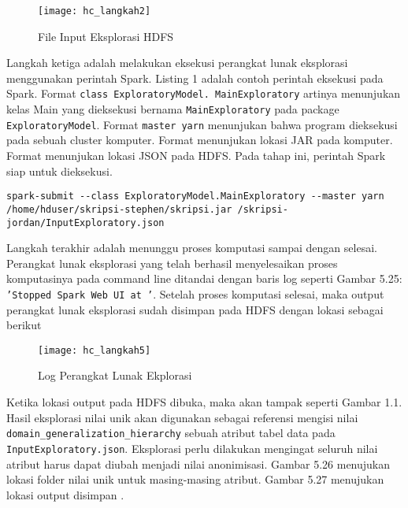 \begin{figure}[H]
	\centering
	\texttt{[image: hc\_langkah2]}
	\caption{File Input Eksplorasi HDFS}
	\label{fig:pertama2}
\end{figure}

Langkah ketiga adalah melakukan eksekusi perangkat lunak eksplorasi menggunakan perintah Spark. Listing 1 adalah contoh perintah eksekusi pada Spark. Format \texttt{\textemdash\textemdash class ExploratoryModel. MainExploratory} artinya menunjukan kelas Main yang dieksekusi bernama \texttt{MainExploratory} pada package \texttt{ExploratoryModel}. Format \texttt{\textemdash\textemdash master yarn} menunjukan bahwa program dieksekusi pada sebuah cluster komputer. Format  menunjukan lokasi JAR pada komputer. Format  menunjukan lokasi JSON pada HDFS. Pada tahap ini, perintah Spark siap untuk dieksekusi.

\begin{lstlisting}[basicstyle=\ttfamily, frame=single,
	columns=fullflexible, keepspaces=true, breaklines=true, label=lst:pl_csv, caption=Perintah Eksekusi Spark]
spark-submit --class ExploratoryModel.MainExploratory --master yarn /home/hduser/skripsi-stephen/skripsi.jar /skripsi-jordan/InputExploratory.json

\end{lstlisting}

\vspace{0.3cm}
Langkah terakhir adalah menunggu proses komputasi sampai dengan selesai.  Perangkat lunak eksplorasi yang telah berhasil menyelesaikan proses komputasinya  pada command line ditandai dengan baris log seperti Gambar 5.25: \texttt{'Stopped Spark Web UI at '}. Setelah proses komputasi selesai, maka output perangkat lunak eksplorasi sudah disimpan pada HDFS dengan lokasi sebagai berikut 

\begin{figure}[H]
	\centering
	\texttt{[image: hc\_langkah5]}
	\caption{Log Perangkat Lunak Ekplorasi}
	\label{fig:pertama2}
\end{figure}

Ketika lokasi output pada HDFS dibuka, maka akan tampak seperti Gambar 1.1. Hasil eksplorasi nilai unik akan digunakan sebagai referensi mengisi nilai \texttt{domain\_generalization\_hierarchy} sebuah atribut tabel data pada \texttt{InputExploratory.json}. Eksplorasi perlu dilakukan mengingat seluruh nilai atribut harus dapat diubah menjadi nilai anonimisasi. Gambar 5.26 menujukan lokasi folder nilai unik untuk masing-masing atribut. Gambar 5.27 menujukan  lokasi output disimpan .

